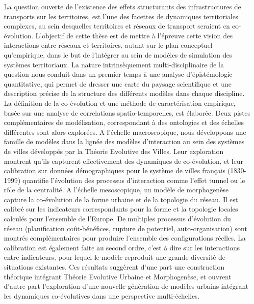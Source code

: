 {
}{
La question ouverte de l'existence des effets structurants des infrastructures de transports sur les territoires, est l'une des facettes de dynamiques territoriales complexes, au sein desquelles territoires et réseaux de transport seraient en co-évolution. L'objectif de cette thèse est de mettre à l'épreuve cette vision des interactions entre réseaux et territoires, autant sur le plan conceptuel qu'empirique, dans le but de l'intégrer au sein de modèles de simulation des systèmes territoriaux. La nature intrinsèquement multi-disciplinaire de la question nous conduit dans un premier temps à une analyse d'épistémologie quantitative, qui permet de dresser une carte du paysage scientifique et une description précise de la structure des différents modèles dans chaque discipline. La définition de la co-évolution et une méthode de caractérisation empirique, basée sur une analyse de correlations spatio-temporelles, est élaborée. Deux pistes complémentaires de modélisation, correspondant à des ontologies et des échelles différentes sont alors explorées. A l'échelle macroscopique, nous développons une famille de modèles dans la lignée des modèles d'interaction au sein des systèmes de villes développés par la Théorie Evolutive des Villes. Leur exploration montrent qu'ils capturent effectivement des dynamiques de co-évolution, et leur calibration sur données démographiques pour le système de villes français (1830-1999) quantifie l'évolution des processus d'interaction comme l'effet tunnel ou le rôle de la centralité. A l'échelle mesoscopique, un modèle de morphogenèse capture la co-évolution de la forme urbaine et de la topologie du réseau. Il est calibré sur les indicateurs correspondants pour la forme et la topologie locales calculés pour l'ensemble de l'Europe. De multiples processus d'évolution du réseau (planification coût-bénéfices, rupture de potentiel, auto-organisation) sont montrés complémentaires pour produire l'ensemble des configurations réelles. La calibration est également faite au second ordre, c'est à dire sur les interactions entre indicateurs, pour lequel le modèle reproduit une grande diversité de situations existantes. Ces résultats suggèrent d'une part une construction théorique intégrant Théorie Evolutive Urbaine et Morphogenèse, et ouvrent d'autre part l'exploration d'une nouvelle génération de modèles urbains intégrant les dynamiques co-évolutives dans une perspective multi-échelles.
}







\endgroup			

\vfill